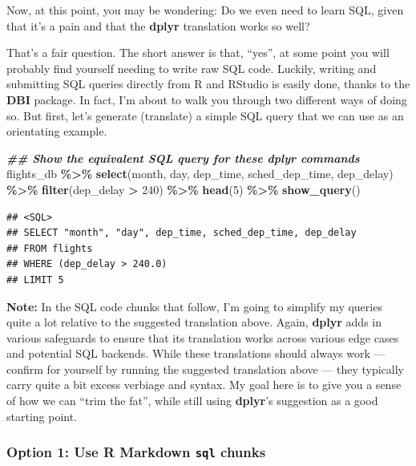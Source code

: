 \documentclass[
]{article}
\newenvironment{Shaded}{\begin{snugshade}}{\end{snugshade}}
\newcommand{\DecValTok}[1]{\textcolor[rgb]{0.00,0.00,0.81}{#1}}
\newcommand{\DocumentationTok}[1]{\textcolor[rgb]{0.56,0.35,0.01}{\textbf{\textit{#1}}}}
\newcommand{\FunctionTok}[1]{\textcolor[rgb]{0.13,0.29,0.53}{\textbf{#1}}}
\newcommand{\NormalTok}[1]{#1}
\newcommand{\SpecialCharTok}[1]{\textcolor[rgb]{0.81,0.36,0.00}{\textbf{#1}}}
\begin{document}
Now, at this point, you may be wondering: Do we even need to learn SQL,
given that it's a pain and that the \textbf{dplyr} translation works so
well?

That's a fair question. The short answer is that, ``yes'', at some point
you will probably find yourself needing to write raw SQL code. Luckily,
writing and submitting SQL queries directly from R and RStudio is easily
done, thanks to the \textbf{DBI} package. In fact, I'm about to walk you
through two different ways of doing so. But first, let's generate
(translate) a simple SQL query that we can use as an orientating
example.

\begin{Shaded}
\begin{Highlighting}[]
\DocumentationTok{\#\# Show the equivalent SQL query for these dplyr commands}
\NormalTok{flights\_db }\SpecialCharTok{\%\textgreater{}\%} 
  \FunctionTok{select}\NormalTok{(month, day, dep\_time, sched\_dep\_time, dep\_delay) }\SpecialCharTok{\%\textgreater{}\%} 
  \FunctionTok{filter}\NormalTok{(dep\_delay }\SpecialCharTok{\textgreater{}} \DecValTok{240}\NormalTok{) }\SpecialCharTok{\%\textgreater{}\%} 
  \FunctionTok{head}\NormalTok{(}\DecValTok{5}\NormalTok{) }\SpecialCharTok{\%\textgreater{}\%} 
  \FunctionTok{show\_query}\NormalTok{()}
\end{Highlighting}
\end{Shaded}

\begin{verbatim}
## <SQL>
## SELECT "month", "day", dep_time, sched_dep_time, dep_delay
## FROM flights
## WHERE (dep_delay > 240.0)
## LIMIT 5
\end{verbatim}

\textbf{Note:} In the SQL code chunks that follow, I'm going to simplify
my queries quite a lot relative to the suggested translation above.
Again, \textbf{dplyr} adds in various safeguards to ensure that its
translation works across various edge cases and potential SQL backends.
While these translations should always work --- confirm for yourself by
running the suggested translation above --- they typically carry quite a
bit excess verbiage and syntax. My goal here is to give you a sense of
how we can ``trim the fat'', while still using \textbf{dplyr}'s
suggestion as a good starting point.

\hypertarget{option-1-use-r-markdown-sql-chunks}{%
\subsubsection{\texorpdfstring{Option 1: Use R Markdown \texttt{sql}
chunks}{Option 1: Use R Markdown sql chunks}}\label{option-1-use-r-markdown-sql-chunks}}
\end{document}
